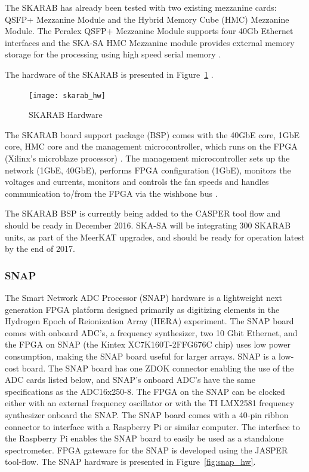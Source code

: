 \documentclass{ws-jai}
\begin{document}
The SKARAB has already been tested with two existing mezzanine cards: QSFP+ Mezzanine Module and the Hybrid Memory Cube (HMC) Mezzanine Module. The Peralex QSFP+ Mezzanine Module supports four 40Gb Ethernet interfaces and the SKA-SA HMC Mezzanine module provides external memory storage for the processing using high speed serial memory \cite{cliff16}.

The hardware of the SKARAB is presented in Figure~\ref{fig:skarab_hw} \cite{cliff16}.

\begin{figure}[h]
\centering
\texttt{[image: skarab\_hw]}
\caption{SKARAB Hardware}
\label{fig:skarab_hw}
\end{figure}

The SKARAB board support package (BSP) comes with the 40GbE core, 1GbE core, HMC core and the management microcontroller, which runs on the FPGA (Xilinx's microblaze processor) \cite{cliff16}. The management microcontroller sets up the network (1GbE, 40GbE), performs FPGA configuration (1GbE), monitors the voltages and currents, monitors and controls the fan speeds and handles communication to/from the FPGA via the wishbone bus \cite{cliff16} \cite{Teagu15}.

The SKARAB BSP is currently being added to the CASPER tool flow and should be ready in December 2016.
SKA-SA will be integrating 300 SKARAB units, as part of the MeerKAT upgrades, and should be ready for operation latest by the end of 2017.


\subsubsection{SNAP}

The Smart Network ADC Processor (SNAP) hardware is a lightweight next generation
FPGA platform designed primarily as digitizing elements in the Hydrogen Epoch of
Reionization Array (HERA) experiment. The SNAP board comes with onboard ADC's, a
frequency synthesizer, two 10 Gbit Ethernet, and the FPGA on SNAP (the Kintex
XC7K160T-2FFG676C chip) uses low power consumption, making the SNAP board useful
for larger arrays. SNAP is a low-cost board. The SNAP board has one ZDOK
connector enabling the use of the ADC cards listed below, and SNAP's onboard
ADC's have the same specifications as the ADC16x250-8. The FPGA on the SNAP can
be clocked either with an external frequency oscillator or with the TI LMX2581
frequency synthesizer onboard the SNAP. The SNAP board comes with a 40-pin
ribbon connector to interface with a  Raspberry Pi or similar computer. The
interface to the Raspberry Pi enables the SNAP board to easily be used as a
standalone spectrometer. FPGA gateware for the SNAP is developed using the
JASPER tool-flow. The SNAP hardware is presented in Figure~\ref{fig:snap_hw}.
\end{document}
